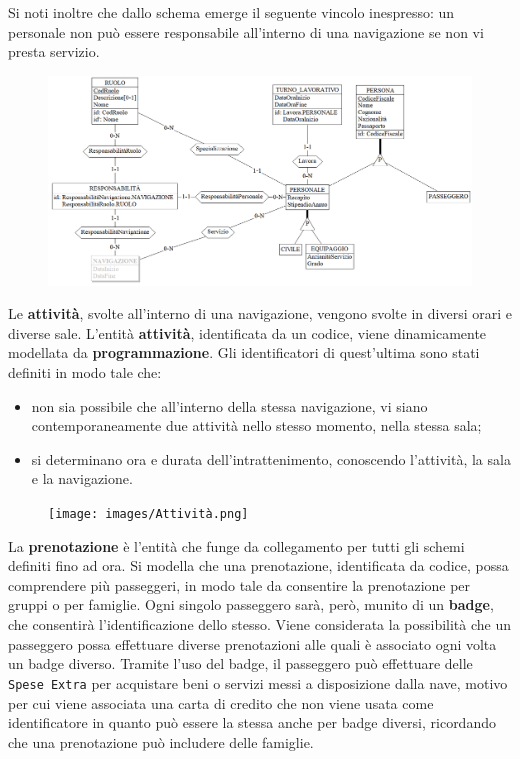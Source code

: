 \documentclass[a4paper, titlepage]{report}
\begin{document}
	Si noti inoltre che dallo schema emerge il seguente vincolo inespresso: un personale non può essere responsabile all’interno di una navigazione se non vi presta servizio.
	
    \noindent	
	\begin{figure}[h]
		\centering
		\includegraphics[scale=0.6]{images/Personale.png}		
	\end{figure}
    \vspace{0.6cm}
\newpage

	\noindent
	Le \textbf{attività}, svolte all'interno di una navigazione, vengono svolte in diversi orari e diverse sale.
	L'entità \textbf{attività}, identificata da un codice, viene dinamicamente modellata da \textbf{programmazione}. Gli identificatori di quest'ultima sono stati definiti in modo tale che:
	\begin{itemize}
		\item non sia possibile che all'interno della stessa navigazione, vi siano contemporaneamente due attività nello stesso momento, nella stessa sala;
		\item si determinano ora e durata dell'intrattenimento, conoscendo l'attività, la sala e la navigazione.
	\end{itemize} 
	 \vspace{0.4cm}
	 \begin{figure}[h]
		\centering
		\texttt{[image: images/Attività.png]}		
	\end{figure}
    \vspace{0.6cm}
    
	\noindent
	La \textbf{prenotazione} è l'entità che funge da collegamento per tutti gli schemi definiti fino ad ora. Si modella che una prenotazione, identificata da codice, possa comprendere più passeggeri, in modo tale da consentire la prenotazione per gruppi o per famiglie. Ogni singolo passeggero sarà, però, munito di un \textbf{badge},  che consentirà l'identificazione dello stesso. Viene considerata la possibilità che un passeggero possa effettuare diverse prenotazioni alle quali è associato ogni volta un badge diverso. Tramite l'uso del badge, il passeggero può effettuare delle \texttt{Spese Extra} per acquistare beni o servizi messi a disposizione dalla nave, motivo per cui viene associata una carta di credito che non viene usata come identificatore in quanto può essere la stessa anche per badge diversi, ricordando che una prenotazione può includere delle famiglie. \\
	
\end{document}
